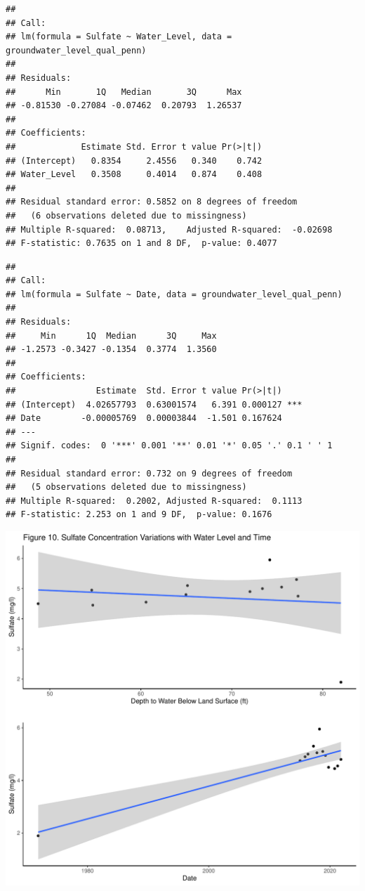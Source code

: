 \documentclass[
  12pt,
]{article}
\begin{document}
\newpage

\begin{verbatim}
## 
## Call:
## lm(formula = Sulfate ~ Water_Level, data = groundwater_level_qual_penn)
## 
## Residuals:
##      Min       1Q   Median       3Q      Max 
## -0.81530 -0.27084 -0.07462  0.20793  1.26537 
## 
## Coefficients:
##             Estimate Std. Error t value Pr(>|t|)
## (Intercept)   0.8354     2.4556   0.340    0.742
## Water_Level   0.3508     0.4014   0.874    0.408
## 
## Residual standard error: 0.5852 on 8 degrees of freedom
##   (6 observations deleted due to missingness)
## Multiple R-squared:  0.08713,    Adjusted R-squared:  -0.02698 
## F-statistic: 0.7635 on 1 and 8 DF,  p-value: 0.4077
\end{verbatim}

\begin{verbatim}
## 
## Call:
## lm(formula = Sulfate ~ Date, data = groundwater_level_qual_penn)
## 
## Residuals:
##     Min      1Q  Median      3Q     Max 
## -1.2573 -0.3427 -0.1354  0.3774  1.3560 
## 
## Coefficients:
##                Estimate  Std. Error t value Pr(>|t|)    
## (Intercept)  4.02657793  0.63001574   6.391 0.000127 ***
## Date        -0.00005769  0.00003844  -1.501 0.167624    
## ---
## Signif. codes:  0 '***' 0.001 '**' 0.01 '*' 0.05 '.' 0.1 ' ' 1
## 
## Residual standard error: 0.732 on 9 degrees of freedom
##   (5 observations deleted due to missingness)
## Multiple R-squared:  0.2002, Adjusted R-squared:  0.1113 
## F-statistic: 2.253 on 1 and 9 DF,  p-value: 0.1676
\end{verbatim}

\newpage

\includegraphics{Elliott_WDA_Project_files/figure-latex/linear_m2-1.pdf}
\end{document}
